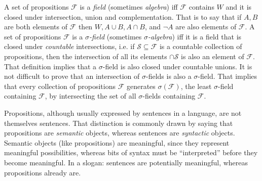 A set of propositions $\mathcal{F}$ is a {\em field} (sometimes {\em algebra})
iff $\mathcal{F}$ contains $W$ and it is closed under intersection, union and
complementation. That is to say that if $A,B$ are both elements of $\mathcal{F}$
then $W,A\cup B,A\cap B$, and  $\neg A$ are also elements of $\mathcal{F}.$ A
set of propositions $\mathcal{F}$ is a {\em $\sigma$-field} (sometimes {\em
$\sigma$-algebra}) iff it is a field that is closed under {\em countable}
intersections, i.e. if $\mathcal{S}\subseteq \mathcal{F}$ is a countable
collection of propositions, then the intersection of all its elements $\cap
\mathcal{S}$ is also an element of $\mathcal{F}.$ That definition implies that a
$\sigma$-field is also closed under countable unions. It is not difficult to
prove that an intersection of $\sigma$-fields is also a $\sigma$-field. That
implies that every collection of propositions $\mathcal{F}$ generates
$\sigma(\mathcal{F})$, the least $\sigma$-field containing $\mathcal{F}$, by
intersecting the set of all $\sigma$-fields containing $\mathcal{F}$. 

Propositions, although usually expressed by sentences in a language, are not
themselves sentences. That distinction is commonly drawn by saying that
propositions are {\em semantic} objects, whereas sentences are {\em syntactic}
objects. Semantic objects (like propositions) are meaningful, since they
represent meaningful possibilities, whereas bits of syntax must be
``interpreted'' before they become meaningful. In a slogan: sentences are
potentially meaningful, whereas propositions already are.

